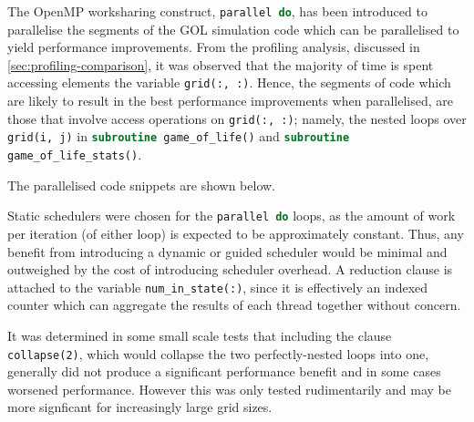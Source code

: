 \documentclass[]{article}
\begin{document}
The OpenMP worksharing construct, \lstinline[language=Fortran]{parallel do}, has
been introduced to parallelise the segments of the GOL simulation code which can
be parallelised to yield performance improvements.
From the profiling analysis, discussed in \autoref{sec:profiling-comparison}, it
was observed that the majority of time is spent accessing elements the variable
\lstinline[language=Fortran]{grid(:, :)}.
Hence, the segments of code which are likely to result in the best performance
improvements when parallelised, are those that involve access operations on
\lstinline[language=Fortran]{grid(:, :)}; namely, the nested loops over
\lstinline[language=Fortran]{grid(i, j)} in
\lstinline[language=Fortran]{subroutine game_of_life()} and
\lstinline[language=Fortran]{subroutine game_of_life_stats()}.

The parallelised code snippets are shown below.





Static schedulers were chosen for the \lstinline[language=Fortran]{parallel do}
loops, as the amount of work per iteration (of either loop) is expected to be
approximately constant.
Thus, any benefit from introducing a dynamic or guided scheduler would be
minimal and outweighed by the cost of introducing scheduler overhead.
A reduction clause is attached to the variable
\lstinline[language=Fortran]{num_in_state(:)}, since it is effectively an
indexed counter which can aggregate the results of each thread together without
concern.

It was determined in some small scale tests that including the clause
\lstinline{collapse(2)}, which would collapse the two perfectly-nested loops
into one, generally did not produce a significant performance benefit and in
some cases worsened performance.
However this was only tested rudimentarily and may be more signficant for
increasingly large grid sizes.
\end{document}
